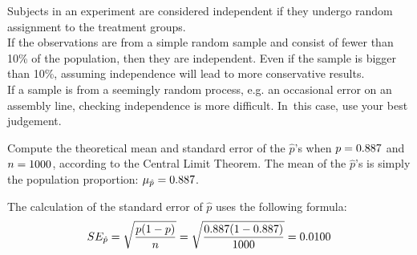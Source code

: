 \begin{tipBox}{
  Subjects in an experiment are considered independent if they undergo
      random assignment to the treatment groups. \\[2mm]
  If the observations are from a simple random sample and consist
      of fewer than 10\% of the population, then they are independent.
      Even if the sample is bigger than 10\%, assuming independence
      will lead to more conservative results. \\[2mm]
  If a sample is from a seemingly random process,
      e.g. an occasional error on an assembly line,
      checking independence is more difficult. In~this case,
      use your best judgement.}
\end{tipBox}

\begin{example}{Compute the theoretical mean and standard error
of the $\hat{p}$'s when
$p = 0.887{}$ and $n = 1000{}$,
according to the
Central Limit Theorem.}\label{sample_p887_n1000_mean_se}
The mean of the $\hat{p}$'s is simply the population proportion:
$\mu_{\hat{p}} = 0.887{}$.

The calculation of the standard error of $\hat{p}$ uses
the following formula:
\begin{align*}
SE_{\hat{p}}
    = \sqrt{\frac{p (1 - p)}{n}}
    = \sqrt{\frac{0.887{} (1 - 0.887{})}{1000}}
    = 0.0100{}
\end{align*}
\end{example}

